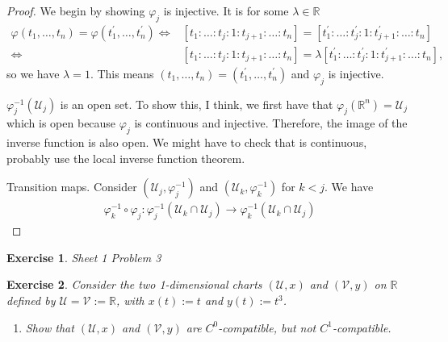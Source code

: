 \documentclass{book}
\theoremstyle{custom_definition}
\newtheorem{exercise}{Exercise}
\theoremstyle{custom_theorem}
\begin{document}
    \begin{proof}
        We begin by showing \(\varphi_j\) is injective. It is for some \(\lambda \in \mathbb{R}\)
        \begin{align}
            \varphi(t_1, \ldots, t_n) = \varphi(t_1^\prime, \ldots, t_n^\prime) \iff & [t_1 : \ldots : t_j : 1 : t_{j+1} : \ldots : t_n] = [t_1^\prime : \ldots : t_j^\prime : 1 : t_{j+1}^\prime : \ldots : t_n] \\
            \iff & [t_1 : \ldots : t_j : 1 : t_{j+1} : \ldots : t_n] = \lambda [t_1^\prime : \ldots : t_j^\prime : 1 : t_{j+1}^\prime : \ldots : t_n] \text{,}
        \end{align}
        so we have \(\lambda = 1\). This means \((t_1, \ldots, t_n) = (t_1^\prime, \ldots, t_n^\prime)\) and \(\varphi_j\) is injective.

        \(\varphi_j^{-1}(\mathcal{U}_j)\) is an open set. To show this, I think, we first have that \(\varphi_j(\mathbb{R}^n) = \mathcal{U}_j\) which is open because \(\varphi_j\) is continuous and injective. Therefore, the image of the inverse function is also open. We might have to check that is continuous, probably use the local inverse function theorem.

        Transition maps. Consider \((\mathcal{U}_j, \varphi_j^{-1})\) and \((\mathcal{U}_k, \varphi_k^{-1})\) for \(k < j\). We have
        \begin{align}
            \varphi_k^{-1} \circ \varphi_j : \varphi_j^{-1}(\mathcal{U}_k \cap \mathcal{U}_j) \longrightarrow \varphi_k^{-1} (\mathcal{U}_k \cap \mathcal{U}_j)
        \end{align}
    \end{proof}
    \begin{exercise}
        Sheet 1 Problem 3
    \end{exercise}
    \begin{exercise}
        Consider the two 1-dimensional charts \((\mathcal{U}, x)\) and \((\mathcal{V}, y)\) on \(\mathbb{R}\) defined by \(\mathcal{U} = \mathcal{V} := \mathbb{R}\), with \(x(t) := t\) and \(y(t) := t^3\).
        \begin{enumerate}
            \item Show that \((\mathcal{U}, x)\) and \((\mathcal{V}, y)\) are \(C^0\)-compatible, but not \(C^1\)-compatible.
        \end{enumerate}
    \end{exercise}
\end{document}

